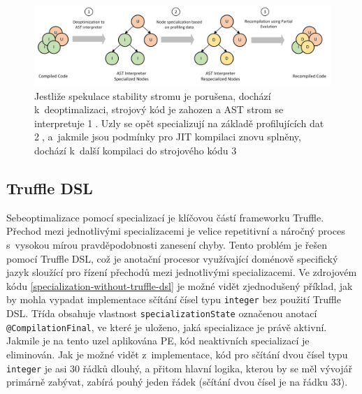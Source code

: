\documentclass[
  master,
  biblatex,
  figures=true,
  theorems,
  sourcecodes,
  glossaries,
  index
]{kidiplom}
\begin{document}
\begin{figure} [h]
    \centering
    \includegraphics[width= 1\textwidth]{images/deoptimization-recompilation-pe.png}
    \caption{Jestliže spekulace stability stromu je porušena, dochází k~deoptimalizaci,  strojový kód je zahozen a AST strom se interpretuje {\Large \textcircled{\normalsize 1}}. Uzly se opět specializují na základě profilujících dat {\Large \textcircled{\normalsize 2}}, a~jakmile jsou podmínky pro JIT kompilaci znovu splněny, dochází k~další kompilaci do strojového kódu {\Large \textcircled{\normalsize 3}} \cite{one-vm-to-rule-them-all}}
    \label{fig:tree-deopt-and-respecilized}
\end{figure}


\clearpage


\subsection{Truffle DSL}
\label{truffle-dsl-chapter}
Sebeoptimalizace pomocí specializací je klíčovou částí frameworku Truffle. Přechod mezi jednotlivými specializacemi je velice repetitivní a náročný proces s~vysokou mírou pravděpodobnosti zanesení chyby. Tento problém je řešen pomocí Truffle DSL, což je anotační procesor využívající doménově specifický jazyk sloužící pro řízení přechodů mezi jednotlivými specializacemi. Ve zdrojovém kódu \ref{specialization-without-truffle-dsl} je možné vidět zjednodušený příklad, jak by mohla vypadat implementace sčítání čísel typu \texttt{integer} bez použití Truffle DSL. Třída obsahuje vlastnost \texttt{specializationState} označenou anotací \texttt{@CompilationFinal}, ve které je uloženo, jaká specializace je právě aktivní. Jakmile je na tento uzel aplikována PE, kód neaktivních specializací je eliminován. Jak je možné vidět z~implementace, kód pro sčítání dvou čísel typu \texttt{integer} je asi 30 řádků dlouhý, a přitom hlavní logika, kterou by se měl vývojář primárně zabývat, zabírá pouhý jeden řádek (sčítání dvou čísel je na řádku 33).  
\end{document}
